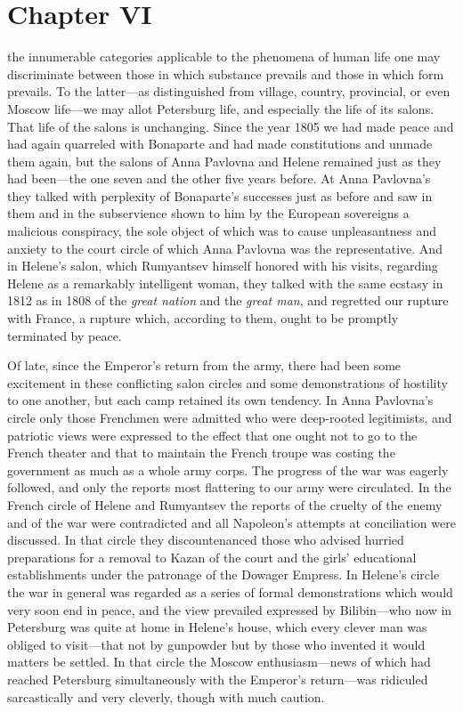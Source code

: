 \chapter*{Chapter VI} \ifaudio {}
\fi

 the innumerable categories applicable to the phenomena of
human life one may discriminate between those in which substance
prevails and those in which form prevails. To the latter---as
distinguished from village, country, provincial, or even Moscow
life---we may allot Petersburg life, and especially the life of
its salons. That life of the salons is unchanging. Since the year
1805 we had made peace and had again quarreled with Bonaparte and
had made constitutions and unmade them again, but the salons of
Anna Pavlovna and Helene remained just as they had been---the one
seven and the other five years before. At Anna Pavlovna's they
talked with perplexity of Bonaparte's successes just as before
and saw in them and in the subservience shown to him by the
European sovereigns a malicious conspiracy, the sole object of
which was to cause unpleasantness and anxiety to the court circle
of which Anna Pavlovna was the representative. And in Helene's
salon, which Rumyantsev himself honored with his visits,
regarding Helene as a remarkably intelligent woman, they talked
with the same ecstasy in 1812 as in 1808 of the \emph{great
nation} and the \emph{great man}, and regretted our rupture with
France, a rupture which, according to them, ought to be promptly
terminated by peace.

Of late, since the Emperor's return from the army, there had been
some excitement in these conflicting salon circles and some
demonstrations of hostility to one another, but each camp
retained its own tendency. In Anna Pavlovna's circle only those
Frenchmen were admitted who were deep-rooted legitimists, and
patriotic views were expressed to the effect that one ought not
to go to the French theater and that to maintain the French
troupe was costing the government as much as a whole army corps.
The progress of the war was eagerly followed, and only the
reports most flattering to our army were circulated. In the
French circle of Helene and Rumyantsev the reports of the cruelty
of the enemy and of the war were contradicted and all Napoleon's
attempts at conciliation were discussed. In that circle they
discountenanced those who advised hurried preparations for a
removal to Kazan of the court and the girls' educational
establishments under the patronage of the Dowager Empress.  In
Helene's circle the war in general was regarded as a series of
formal demonstrations which would very soon end in peace, and the
view prevailed expressed by Bilibin---who now in Petersburg was
quite at home in Helene's house, which every clever man was
obliged to visit---that not by gunpowder but by those who
invented it would matters be settled. In that circle the Moscow
enthusiasm---news of which had reached Petersburg simultaneously
with the Emperor's return---was ridiculed sarcastically and very
cleverly, though with much caution.

